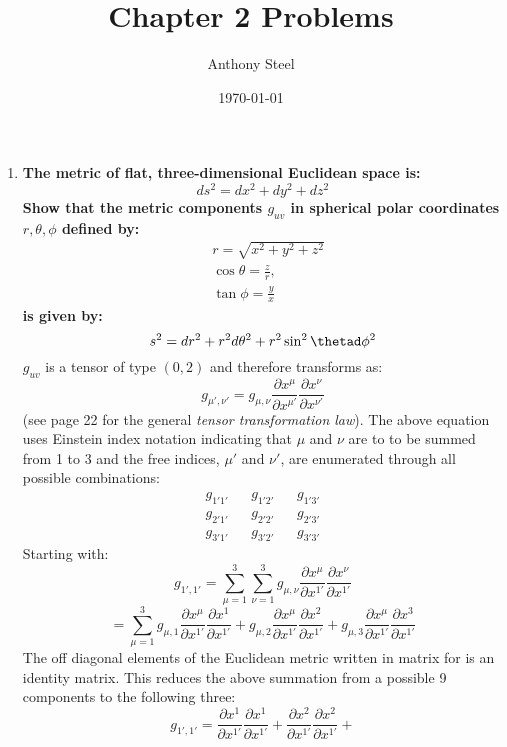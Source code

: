 \documentclass[a4paper]{article}
\begin{document}
\title{Chapter 2 Problems}
\author{Anthony Steel}
\date{\today}
\maketitle
\begin{enumerate}
  \item \textbf{The metric of flat, three-dimensional Euclidean space is:} \[
      ds^2 = dx^2 + dy^2 + dz^2
  \]
  \textbf{Show that the metric components $g_{uv}$ in spherical polar
  coordinates $r, \theta, \phi$ defined by:}
  \[
    \begin{align*}
      &r = \sqrt{x^2 + y^2 + z^2} \\
      &\cos\theta = \frac{z}{r}, \\
      &\tan\phi = \frac{y}{x}
    \end{align*}
  \]
  \textbf{is given by:}
  \[
    s^2 = dr^2 + r^2 d\theta^2 + r^2 \sin^2\thetad\phi^2
  \]
 $g_{uv}$ is a tensor of type $\left( 0,2 \right) $ and therefore transforms as:
  \[
    g_{\mu',\nu'} = g_{\mu,\nu} \frac{\partial x^\mu}{\partial x^{\mu'}}\frac{\partial x^\nu}{\partial x^{\nu'}}
  \]
  (see page 22 for the general \textit{tensor transformation law}). The above
  equation uses Einstein index notation indicating that $\mu$ and $\nu$ are to
  to be summed from 1 to 3 and the free indices, $\mu'$ and $\nu'$, are
  enumerated through all possible combinations:
  \[
    \begin{matrix}
      g_{1'1'}  && g_{1'2'} && g_{1'3'} \\
      g_{2'1'} && g_{2'2'} && g_{2'3'} \\
      g_{3'1'} && g_{3'2'} && g_{3'3'}
    \end{matrix}
  \]
  Starting with:
  \[
    g_{1',1'} =
    \sum_{\mu=1}^{3} \sum_{\nu=1}^{3} g_{\mu,\nu} \frac{\partial x^\mu}{\partial x^{1'}} \frac{\partial x^\nu}{\partial x^{1'}}
  \]
  \[
    = \sum_{\mu=1}^{3}
    g_{\mu, 1} \frac{\partial x^\mu}{\partial x^{1'}} \frac{\partial x^1}{\partial x^{1'}} +
    g_{\mu, 2} \frac{\partial x^\mu}{\partial x^{1'}} \frac{\partial x^2}{\partial x^{1'}} +
    g_{\mu, 3} \frac{\partial x^\mu}{\partial x^{1'}} \frac{\partial x^3}{\partial x^{1'}}
  \]
  The off diagonal elements of the Euclidean metric written in matrix for is an
  identity matrix. This reduces the above summation from a possible 9
  components to the following three: \[
    g_{1',1'} =
    \frac{\partial x^1}{\partial x^{1'}} \frac{\partial x^1}{\partial x^{1'}} +
    \frac{\partial x^2}{\partial x^{1'}} \frac{\partial x^2}{\partial x^{1'}} +
\]
\end{enumerate}
\end{document}
